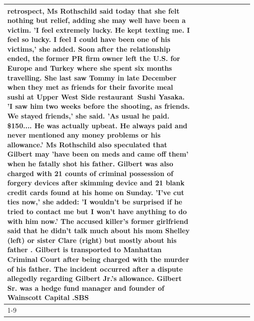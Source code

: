 \begin{table}[H]
\begin{tabular}{lllrlllll}
retrospect, Ms Rothschild said today that she felt nothing but relief, adding she may well have been a victim. 'I feel extremely lucky. He kept texting me. I feel so lucky. I feel I could have been one of his victims,' she added. Soon after the relationship ended, the former PR firm owner left the U.S. for Europe and Turkey where she spent six months  travelling. She last saw Tommy in late December when they met as friends for their favorite meal sushi at Upper West Side restaurant Sushi Yasaka. 'I saw him two weeks before the shooting, as friends. We stayed friends,' she said. 'As usual he paid. \$150.... He was actually upbeat. He always paid and never mentioned any money problems or his allowance.' Ms Rothschild also speculated that Gilbert may 'have been on meds and came off them' when he fatally shot his father. Gilbert was also charged with 21 counts of criminal possession of forgery devices after skimming device and 21 blank credit cards found at his home on Sunday. 'I've cut ties now,' she added: 'I wouldn’t be surprised if he tried to contact me but I won’t have anything to do with him now.' The accused killer's former girlfriend said that he didn't talk much about his mom Shelley (left) or sister Clare (right) but mostly about his father . Gilbert is transported to Manhattan Criminal Court  after being charged with the murder of his father. The incident occurred after a dispute allegedly regarding Gilbert Jr.'s allowance. Gilbert Sr. was a hedge fund manager and founder of Wainscott Capital .SBS \\
\cline{1-9}

\end{tabular}
\end{table}

